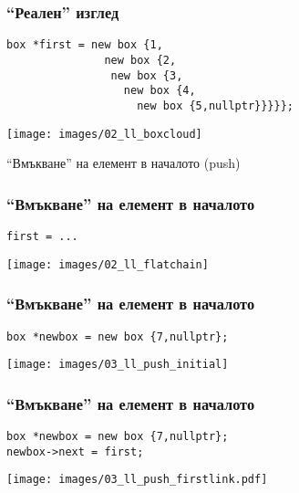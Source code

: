\documentclass{beamer}
\begin{document}
\begin{frame}[fragile]
\frametitle{``Реален'' изглед}

\begin{flushleft}
\begin{lstlisting}
box *first = new box {1,
               new box {2, 
                new box {3, 
                  new box {4, 
                    new box {5,nullptr}}}}};
\end{lstlisting}  
\end{flushleft}


\texttt{[image: images/02\_ll\_boxcloud]}

\end{frame}



\begin{frame}
\centerline{``Вмъкване'' на елемент в началото (push)}
\end{frame}



\begin{frame}[fragile]
\frametitle{``Вмъкване'' на елемент в началото}

\begin{flushleft}
\begin{lstlisting}
first = ...
\end{lstlisting}  
\end{flushleft}


\texttt{[image: images/02\_ll\_flatchain]}

\end{frame}


\begin{frame}[fragile]
\frametitle{``Вмъкване'' на елемент в началото}

\begin{flushleft}
\begin{lstlisting}
box *newbox = new box {7,nullptr};
\end{lstlisting}  
\end{flushleft}


\texttt{[image: images/03\_ll\_push\_initial]}

\end{frame}

\begin{frame}[fragile]
\frametitle{``Вмъкване'' на елемент в началото}

\begin{flushleft}
\begin{lstlisting}
box *newbox = new box {7,nullptr};
newbox->next = first;
\end{lstlisting}  
\end{flushleft}


\texttt{[image: images/03\_ll\_push\_firstlink.pdf]}

\end{frame}
\end{document}
